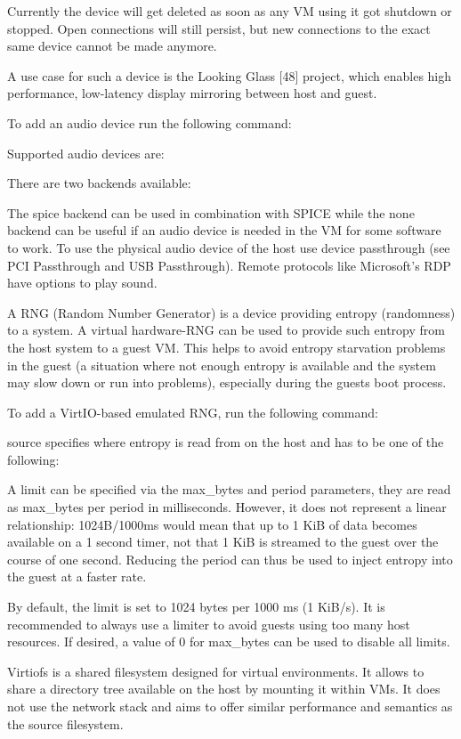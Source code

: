 Currently the device will get deleted as soon as any VM using it got shutdown or stopped. Open connections will still persist, but new connections to the exact same device cannot be made anymore.

A use case for such a device is the Looking Glass [48] project, which enables high performance, low-latency display mirroring between host and guest.

To add an audio device run the following command:

Supported audio devices are:

There are two backends available:

The spice backend can be used in combination with SPICE while the none backend can be useful if an audio device is needed in the VM for some software to work. To use the physical audio device of the host use device passthrough (see PCI Passthrough and USB Passthrough). Remote protocols like Microsoft’s RDP have options to play sound.

A RNG (Random Number Generator) is a device providing entropy (randomness) to a system. A virtual hardware-RNG can be used to provide such entropy from the host system to a guest VM. This helps to avoid entropy starvation problems in the guest (a situation where not enough entropy is available and the system may slow down or run into problems), especially during the guests boot process.

To add a VirtIO-based emulated RNG, run the following command:

source specifies where entropy is read from on the host and has to be one of the following:

A limit can be specified via the max_bytes and period parameters, they are read as max_bytes per period in milliseconds. However, it does not represent a linear relationship: 1024B/1000ms would mean that up to 1 KiB of data becomes available on a 1 second timer, not that 1 KiB is streamed to the guest over the course of one second. Reducing the period can thus be used to inject entropy into the guest at a faster rate.

By default, the limit is set to 1024 bytes per 1000 ms (1 KiB/s). It is recommended to always use a limiter to avoid guests using too many host resources. If desired, a value of 0 for max_bytes can be used to disable all limits.

Virtiofs is a shared filesystem designed for virtual environments. It allows to share a directory tree available on the host by mounting it within VMs. It does not use the network stack and aims to offer similar performance and semantics as the source filesystem.

